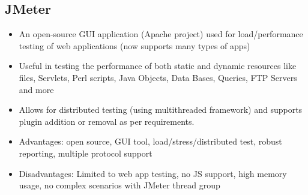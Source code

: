 \documentclass{article}
\begin{document}
\subsection{JMeter}
\begin{itemize}
    \item An open-source GUI application (Apache project) used for load/performance testing of web applications (now supports many types of apps)
    
    \item Useful in testing the performance of both static and dynamic resources like files, Servlets, Perl scripts, Java Objects, Data Bases, Queries, FTP Servers and more
    
    \item Allows for distributed testing (using multithreaded framework) and supports plugin addition or  removal as per requirements.
    
    \item Advantages: open source, GUI tool, load/stress/distributed test, robust reporting, multiple protocol support
    
    \item Disadvantages: Limited to web app testing, no JS support, high memory usage, no complex scenarios with JMeter thread group
\end{itemize}
\end{document}
